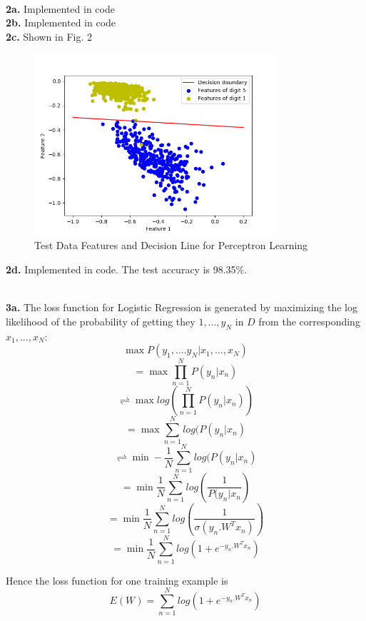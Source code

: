 \documentclass[letterpaper]{article}
\begin{document}
\\

\noindent \textbf{2a.} Implemented in code\\

\noindent \textbf{2b.} Implemented in code\\

\noindent \textbf{2c.} Shown in Fig. 2\\

 \begin{figure}
	\centering
	\includegraphics[width=0.8\textwidth]{test_features_img1.png}
	\caption{\label{fig:data}Test Data Features and Decision Line for Perceptron Learning}
\end{figure}

\noindent \textbf{2d.} Implemented in code. The test accuracy is 98.35\%.

\\

\noindent \textbf{3a.} The loss function for Logistic Regression is generated by maximizing the log likelihood of the probability of getting they \(1,...,y_N\) in \(D\) from the corresponding \(x_1,...,x_N\): 
\[\max P(y_1,....y_N | x_1,...,x_N)\]
\[= \max \prod_{n=1}^{N} P(y_n|x_n)\]
\[\rightleftharpoons\max log(\prod_{n=1}^{N} P(y_n|x_n))\]
\[= \max \sum_{n=1}^{N} log(P(y_n|x_n)\]
\[\rightleftharpoons\min -\frac{1}{N} \sum_{n=1}^{N} log(P(y_n|x_n)\]
\[= \min \frac{1}{N} \sum_{n=1}^{N} log(\frac{1}{P(y_n|x_n})\]
\[= \min \frac{1}{N} \sum_{n=1}^{N} log(\frac{1}{\sigma(y_n.W^Tx_n)})\]
\[= \min \frac{1}{N} \sum_{n=1}^{N} log(1+e^{-y_n.W^Tx_n})\]

Hence the loss function for one training example is \[E(W) = \sum_{n=1}^{N} log(1+e^{-y_n.W^Tx_n})\]\\
\end{document}
